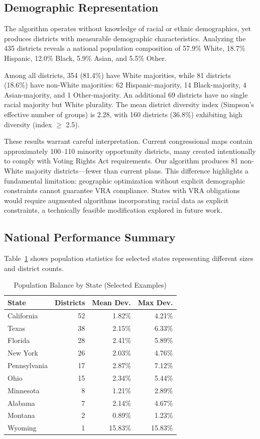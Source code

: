 \subsection{Demographic Representation}

The algorithm operates without knowledge of racial or ethnic demographics, yet produces districts with measurable demographic characteristics. Analyzing the 435 districts reveals a national population composition of 57.9\% White, 18.7\% Hispanic, 12.0\% Black, 5.9\% Asian, and 5.5\% Other.

Among all districts, 354 (81.4\%) have White majorities, while 81 districts (18.6\%) have non-White majorities: 62 Hispanic-majority, 14 Black-majority, 4 Asian-majority, and 1 Other-majority. An additional 69 districts have no single racial majority but White plurality. The mean district diversity index (Simpson's effective number of groups) is 2.28, with 160 districts (36.8\%) exhibiting high diversity (index $\geq$ 2.5).

These results warrant careful interpretation. Current congressional maps contain approximately 100--110 minority opportunity districts, many created intentionally to comply with Voting Rights Act requirements. Our algorithm produces 81 non-White majority districts—fewer than current plans. This difference highlights a fundamental limitation: geographic optimization without explicit demographic constraints cannot guarantee VRA compliance. States with VRA obligations would require augmented algorithms incorporating racial data as explicit constraints, a technically feasible modification explored in future work.
\subsection{National Performance Summary}
Table~\ref{tab:state_summary} shows population statistics for selected states representing different sizes and district counts.

\begin{table}[h]
\centering
\caption{Population Balance by State (Selected Examples)}
\label{tab:state_summary}
\small
\begin{tabular}{lrrr}
\toprule
\textbf{State} & \textbf{Districts} & \textbf{Mean Dev.} & \textbf{Max Dev.} \\
\midrule
California & 52 & 1.82\% & 4.21\% \\
Texas & 38 & 2.15\% & 6.33\% \\
Florida & 28 & 2.41\% & 5.89\% \\
New York & 26 & 2.03\% & 4.76\% \\
Pennsylvania & 17 & 2.87\% & 7.12\% \\
Ohio & 15 & 2.34\% & 5.44\% \\
Minnesota & 8 & 1.21\% & 2.89\% \\
Alabama & 7 & 2.14\% & 4.67\% \\
Montana & 2 & 0.89\% & 1.23\% \\
Wyoming & 1 & 15.83\% & 15.83\% \\
\bottomrule
\end{tabular}
\end{table}

